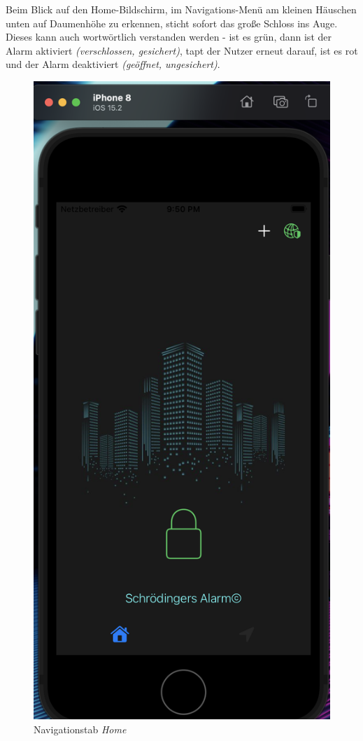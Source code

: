 Beim Blick auf den Home-Bildschirm, im Navigations-Menü am kleinen Häuschen unten auf Daumenhöhe zu erkennen, sticht sofort das große Schloss ins Auge. Dieses kann auch wortwörtlich verstanden werden - ist es grün, dann ist der Alarm aktiviert \textit{(verschlossen, gesichert)}, tapt der Nutzer erneut darauf, ist es rot und der Alarm deaktiviert \textit{(geöffnet, ungesichert)}.
\begin{figure} [H]
	\begin{center}
		\includegraphics[width=1\textwidth]{Bilder/iOS_home.png}
		\caption{Navigationstab \textit{Home}}
		\label{lock}
	\end{center}
\end{figure}
